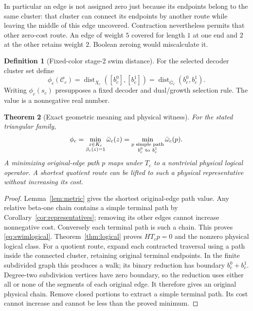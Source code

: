 \documentclass[11pt]{article}
\theoremstyle{definition}
\newtheorem{definition}{Definition}[section]
\theoremstyle{plain}
\newtheorem{theorem}[definition]{Theorem}
\theoremstyle{remark}
\begin{document}
In particular an edge is not assigned zero just because its endpoints
belong to the same cluster: that cluster can connect its endpoints
by another route while leaving the middle of this edge uncovered.
Contraction nevertheless permits that other zero-cost route.
An edge of weight $5$ covered for length $1$ at one end and $2$ at
the other retains weight $2$. Boolean zeroing would miscalculate it.

\begin{definition}[Fixed-color stage-2 swim distance]\label{def:swim}
For the selected decoder cluster set define
\begin{equation}
 \phi_c(\mathcal C_c)=
 \operatorname{dist}_{\bar X_c}([b_c^0],[b_c^1])
 =\operatorname{dist}_{\bar G_c}(b_c^0,b_c^1).
 \label{eq:swim}
\end{equation}
Writing $\phi_c(s_c)$ presupposes a fixed decoder and dual/growth
selection rule. The value is a nonnegative real number.
\end{definition}

\begin{theorem}[Exact geometric meaning and physical witness]
\label{thm:swim}
For the stated triangular family,
\begin{equation}
 \phi_c=\min_{\substack{z\in K_c\\\beta_c(z)=1}}\bar\omega_c(z)
       =\min_{\substack{p\text{ simple path}\\ b_c^0\ {\rm to}\ b_c^1}}
                      \bar\omega_c(p).
 \label{eq:swimlogical}
\end{equation}
A minimizing original-edge path $p$ maps under $T_c$ to a nontrivial
physical logical operator. A shortest quotient route can be lifted
to such a physical representative without increasing its cost.
\end{theorem}
\begin{proof}
Lemma~\ref{lem:metric} gives the shortest original-edge path value.
Any relative beta-one chain contains a simple terminal path by
Corollary~\ref{cor:representatives}; removing its other edges cannot
increase nonnegative cost. Conversely each terminal path is such a
chain. This proves \eqref{eq:swimlogical}.
Theorem~\ref{thm:logical} proves $HT_cp=0$ and the nonzero physical
logical class. For a quotient route, expand each contracted traversal
using a path inside the connected cluster, retaining original
terminal endpoints. In the finite subdivided graph this produces
a walk; its binary reduction has boundary $b_c^0+b_c^1$.
Degree-two subdivision vertices have zero boundary, so the reduction
uses either all or none of the segments of each original edge.
It therefore gives an original physical chain. Remove closed
portions to extract a simple terminal path. Its cost cannot increase
and cannot be less than the proved minimum.
\end{proof}
\end{document}
